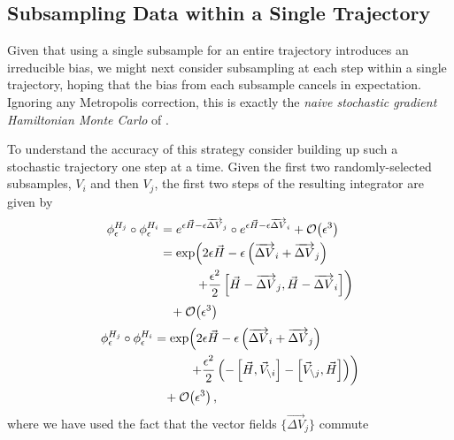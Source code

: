 \documentclass{article}
\begin{document}
\subsection{Subsampling Data within a Single Trajectory}

Given that using a single subsample for an entire trajectory introduces an
irreducible bias, we might next consider subsampling at each step within
a single trajectory, hoping that the bias from each subsample cancels
in expectation.  Ignoring any Metropolis correction, this is exactly the
\textit{naive stochastic gradient Hamiltonian Monte Carlo} of \cite{ChenEtAl:2014}.

To understand the accuracy of this strategy consider building up such a 
stochastic trajectory one step at a time.  Given the first two randomly-selected 
subsamples, $V_{i}$ and then $V_{j}$, the first two steps of the resulting
integrator are given by
%
\begin{align*}
\phi^{H_{j}}_{\epsilon} \circ \phi^{H_{i}}_{\epsilon}
&=
e^{ \epsilon \vec{H} - \epsilon  \overrightarrow{ \Delta V}_{j} } 
\circ e^{ \epsilon \vec{H} - \epsilon  \overrightarrow{ \Delta V}_{i} }
+ \mathcal{O} \! \left( \epsilon^{3} \right)
\\
&=
\exp \! \left( 
2 \epsilon \vec{H} - \epsilon \left(  \overrightarrow{ \Delta V}_{i} +  \overrightarrow{ \Delta V}_{j} \right)
\right.
\\
& \hspace{10mm} \left.
+ \frac{\epsilon^{2}}{2} \left[ \vec{H} -  \overrightarrow{ \Delta V}_{j}, \vec{H} - \overrightarrow{ \Delta V}_{i} \right]
\right)
\\
& \hspace{3mm}
+ \mathcal{O} \! \left( \epsilon^{3} \right)
\end{align*}
%
\begin{align*}
\phi^{H_{j}}_{\epsilon} \circ \phi^{H_{i}}_{\epsilon}
&=
\exp \! \left( 
2 \epsilon \vec{H} - \epsilon \left( \overrightarrow{ \Delta V}_{i} + \overrightarrow{ \Delta V}_{j} \right)
\right.
\\
& \hspace{10mm} \left.
+ \frac{\epsilon^{2}}{2} \left(
- \left[ \vec{H}, \vec{V}_{\setminus i} \right]
- \left[ \vec{V}_{\setminus j}, \vec{H} \right] \right) \right)
\\
& \hspace{3mm}
+ \mathcal{O} \! \left( \epsilon^{3} \right),
\end{align*}
%
where we have used the fact that the vector fields $\{ \overrightarrow{ \Delta V}_{j} \}$ commute
\end{document}
